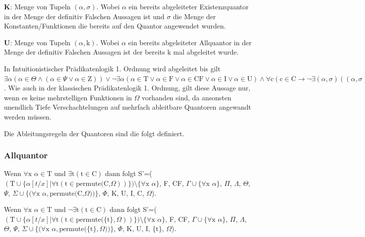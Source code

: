 \begin{description}
\item \textbf{K}: Menge von Tupeln $(\alpha, \sigma)$. Wobei $\alpha$ ein bereits abgeleiteter Existenzquantor in der Menge der definitiv Falschen Aussagen ist und $\sigma$ die Menge der Konstanten/Funktionen die bereits auf den Quantor angewendet wurden.

\item \textbf{U}: Menge von Tupeln $(\alpha, \textrm{k})$. Wobei $\alpha$ ein bereits abgeleiteter Allquantor in der Menge der definitiv Falschen Aussagen ist der bereits k mal abgeleitet wurde.
\end{description}

In Intuitionistischer Prädikatenlogik 1. Ordnung wird abgeleitet bis gilt $\exists\alpha(\alpha\in\Theta\wedge(\alpha\in\Psi\vee\alpha\in\textrm{Z}))\vee\neg\exists\alpha(\alpha\in\textrm{T}\vee\alpha\in\textrm{F}\vee\alpha\in\textrm{CF}\vee\alpha\in\textrm{I}\vee\alpha\in\textrm{U})\wedge\forall\textrm{c}(\textrm{c}\in\textrm{C}\rightarrow\neg\exists(\alpha,\sigma)((\alpha,\sigma)\in\Sigma\wedge\textrm{c}\notin\sigma)\wedge\neg\exists(\alpha,\sigma)((\alpha,\sigma)\in\Phi\wedge\textrm{c}\notin\sigma)\wedge\neg\exists(\alpha,\sigma)((\alpha,\sigma)\in\textrm{K}\wedge\textrm{c}\notin\sigma))$. Wie auch in der klassischen Prädikatenlogik 1. Ordnung, gilt diese Aussage nur, wenn es keine mehrstelligen Funktionen in $\Omega$ vorhanden sind, da ansonsten unendlich Tiefe Verschachtelungen auf mehrfach ableitbare Quantoren angewandt werden müssen.

Die Ableitungsregeln der Quantoren sind die folgt definiert.
\subsubsection{Allquantor}
Wenn $\forall\textrm{x}$ $\alpha\in\textrm{T}$ und $\exists\textrm{t}(\textrm{t}\in\textrm{C})$ dann folgt S'=($(\textrm{T}\cup\lbrace\alpha[t/x]|\forall\textrm{t}(\textrm{t}\in\textrm{permute(C,}\Omega))\rbrace)\setminus\lbrace\forall\textrm{x}$ $\alpha\rbrace$, F, CF, $\Gamma\cup\lbrace\forall\textrm{x}$ $\alpha\rbrace$, $\Pi$, $\Lambda$, $\Theta$, $\Psi$, $\Sigma\cup\lbrace(\forall\textrm{x}$ $\alpha,\textrm{permute(C,}\Omega))\rbrace$, $\Phi$, K, U, I, C, $\Omega$).

Wenn $\forall\textrm{x}$ $\alpha\in\textrm{T}$ und $\neg\exists\textrm{t}(\textrm{t}\in\textrm{C})$ dann folgt S'=($(\textrm{T}\cup\lbrace\alpha[t/x]|\forall\textrm{t}(\textrm{t}\in\textrm{permute(}\lbrace\textrm{t}\rbrace,\Omega))\rbrace)\setminus\lbrace\forall\textrm{x}$ $\alpha\rbrace$, F, CF, $\Gamma\cup\lbrace\forall\textrm{x}$ $\alpha\rbrace$, $\Pi$, $\Lambda$, $\Theta$, $\Psi$, $\Sigma\cup\lbrace(\forall\textrm{x}$ $\alpha,\textrm{permute(}\lbrace\textrm{t}\rbrace,\Omega))\rbrace$, $\Phi$, K, U, I, $\lbrace\textrm{t}\rbrace$, $\Omega$).

